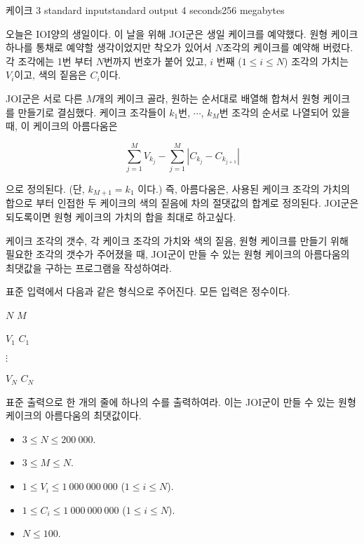\begin{problem}{케이크 3}
	{standard input}{standard output}
	{4 seconds}{256 megabytes}{}
	
	오늘은 IOI양의 생일이다. 이 날을 위해 JOI군은 생일 케이크를 예약했다. 원형 케이크 하나를 통채로 예약할 생각이었지만 착오가 있어서 $N$조각의 케이크를 예약해 버렸다. 각 조각에는 1번 부터 $N$번까지 번호가 붙어 있고, $i$ 번째 ($1 \le i \le N$) 조각의 가치는 $V_i$이고, 색의 짙음은 $C_i$이다.
	
	JOI군은 서로 다른 $M$개의 케이크 골라, 원하는 순서대로 배열해 합쳐서 원형 케이크를 만들기로 결심했다. 케이크 조각들이 $k_1$번, $\cdots$, $k_M$번 조각의 순서로 나열되어 있을 때, 이 케이크의 아름다움은 
	
	$$
	\sum_{j=1}^{M} {V_{k_j}} - \sum_{j=1}^{M} {\left| C_{k_j} - C_{k_{j+1}}\right|}
	$$
	
	으로 정의된다. (단, $k_{M+1} = k_1$ 이다.) 즉, 아름다움은, 사용된 케이크 조각의 가치의 합으로 부터 인접한 두 케이크의 색의 짙음에 차의 절댓값의 합계로 정의된다. JOI군은 되도록이면 원형 케이크의 가치의 합을 최대로 하고싶다.
	
	케이크 조각의 갯수, 각 케이크 조각의 가치와 색의 짙음, 원형 케이크를 만들기 위해 필요한 조각의 갯수가 주어졌을 때, JOI군이 만들 수 있는 원형 케이크의 아름다움의 최댓값을 구하는 프로그램을 작성하여라.
	
	\InputFile
	
	표준 입력에서 다음과 같은 형식으로 주어진다. 모든 입력은 정수이다.
	
	$N$ $M$

	$V_1$ $C_1$
	
	$\vdots$
	
	$V_N$ $C_N$
	
	\OutputFile
	
	표준 출력으로 한 개의 줄에 하나의 수를 출력하여라. 이는 JOI군이 만들 수 있는 원형 케이크의 아름다움의 최댓값이다.
		
	\Constraints
	
	\begin{itemize}
		\item $3 \le N \le 200\ 000$.
		\item $3 \le M \le N$.
		\item $1 \le V_i \le 1\ 000\ 000\ 000$ ($1 \le i \le N$).
		\item $1 \le C_i \le 1\ 000\ 000\ 000$ ($1 \le i \le N$).
	\end{itemize}
	
	
	\begin{itemize}
		\item $N \le 100$.
	\end{itemize}



\end{problem}
